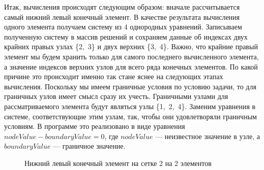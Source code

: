 \documentclass[a4paper,14pt]{extarticle}
\begin{document}
Итак, вычисления происходят следующим образом: вначале рассчитывается самый нижний левый конечный элемент. В качестве результата вычисления одного элемента получаем систему из 4 однородных уравнений. Записываем полученную систему в массив решений и сохраняем данные об индексах двух крайних правых узлах \{2,~3\} и двух верхних \{3,~4\}. Важно, что крайние правый элемент мы будем хранить только для самого последнего вычисленного элемента, а значение индексов верхних узлов для всего ряда конечных элементов. По какой причине это происходит именно так стане яснее на следующих этапах вычисления. Поскольку мы имеем граничные условия по условию задачи, то для граничных узлов имеет смысл сразу их учесть. Граничными узлами для рассматриваемого элемента будут являться узлы \{1,~2,~4\}. Заменим уравнения в системе, соответствующие этим узлам, так, чтобы они удовлетворяли граничным условиям. В программе это реализовано в виде уравнения $nodeValue - boundaryValue = 0$, где $nodeValue$ --- неизвестное значение в узле, а $boundaryValue$ --- граничное значение. 
\begin{figure}[!htbp]
	\caption{Нижний левый конечный элемент на сетке 2 на 2 элементов}
	\label{left-bottom-el}
\end{figure}
\end{document}
